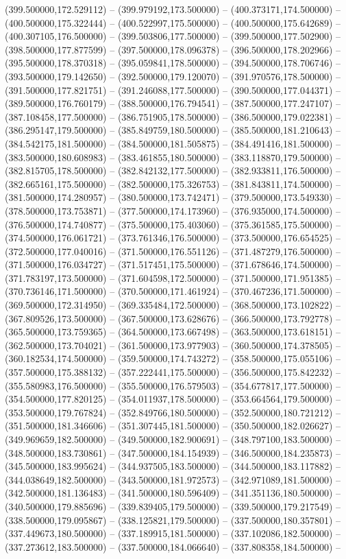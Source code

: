 (399.500000,172.529112) -- (399.979192,173.500000) -- (400.373171,174.500000) -- (400.500000,175.322444) -- (400.522997,175.500000) -- (400.500000,175.642689) -- (400.307105,176.500000) -- (399.503806,177.500000) -- (399.500000,177.502900) -- (398.500000,177.877599) -- (397.500000,178.096378) -- (396.500000,178.202966) -- (395.500000,178.370318) -- (395.059841,178.500000) -- (394.500000,178.706746) -- (393.500000,179.142650) -- (392.500000,179.120070) -- (391.970576,178.500000) -- (391.500000,177.821751) -- (391.246088,177.500000) -- (390.500000,177.044371) -- (389.500000,176.760179) -- (388.500000,176.794541) -- (387.500000,177.247107) -- (387.108458,177.500000) -- (386.751905,178.500000) -- (386.500000,179.022381) -- (386.295147,179.500000) -- (385.849759,180.500000) -- (385.500000,181.210643) -- (384.542175,181.500000) -- (384.500000,181.505875) -- (384.491416,181.500000) -- (383.500000,180.608983) -- (383.461855,180.500000) -- (383.118870,179.500000) -- (382.815705,178.500000) -- (382.842132,177.500000) -- (382.933811,176.500000) -- (382.665161,175.500000) -- (382.500000,175.326753) -- (381.843811,174.500000) -- (381.500000,174.280957) -- (380.500000,173.742471) -- (379.500000,173.549330) -- (378.500000,173.753871) -- (377.500000,174.173960) -- (376.935000,174.500000) -- (376.500000,174.740877) -- (375.500000,175.403060) -- (375.361585,175.500000) -- (374.500000,176.061721) -- (373.761346,176.500000) -- (373.500000,176.654525) -- (372.500000,177.040016) -- (371.500000,176.551126) -- (371.487279,176.500000) -- (371.500000,176.034727) -- (371.517451,175.500000) -- (371.678646,174.500000) -- (371.783197,173.500000) -- (371.604598,172.500000) -- (371.500000,171.951385) -- (370.736146,171.500000) -- (370.500000,171.461924) -- (370.467236,171.500000) -- (369.500000,172.314950) -- (369.335484,172.500000) -- (368.500000,173.102822) -- (367.809526,173.500000) -- (367.500000,173.628676) -- (366.500000,173.792778) -- (365.500000,173.759365) -- (364.500000,173.667498) -- (363.500000,173.618151) -- (362.500000,173.704021) -- (361.500000,173.977903) -- (360.500000,174.378505) -- (360.182534,174.500000) -- (359.500000,174.743272) -- (358.500000,175.055106) -- (357.500000,175.388132) -- (357.222441,175.500000) -- (356.500000,175.842232) -- (355.580983,176.500000) -- (355.500000,176.579503) -- (354.677817,177.500000) -- (354.500000,177.820125) -- (354.011937,178.500000) -- (353.664564,179.500000) -- (353.500000,179.767824) -- (352.849766,180.500000) -- (352.500000,180.721212) -- (351.500000,181.346606) -- (351.307445,181.500000) -- (350.500000,182.026627) -- (349.969659,182.500000) -- (349.500000,182.900691) -- (348.797100,183.500000) -- (348.500000,183.730861) -- (347.500000,184.154939) -- (346.500000,184.235873) -- (345.500000,183.995624) -- (344.937505,183.500000) -- (344.500000,183.117882) -- (344.038649,182.500000) -- (343.500000,181.972573) -- (342.971089,181.500000) -- (342.500000,181.136483) -- (341.500000,180.596409) -- (341.351136,180.500000) -- (340.500000,179.885696) -- (339.839405,179.500000) -- (339.500000,179.217549) -- (338.500000,179.095867) -- (338.125821,179.500000) -- (337.500000,180.357801) -- (337.449673,180.500000) -- (337.189915,181.500000) -- (337.102086,182.500000) -- (337.273612,183.500000) -- (337.500000,184.066640) -- (337.808358,184.500000) -- 